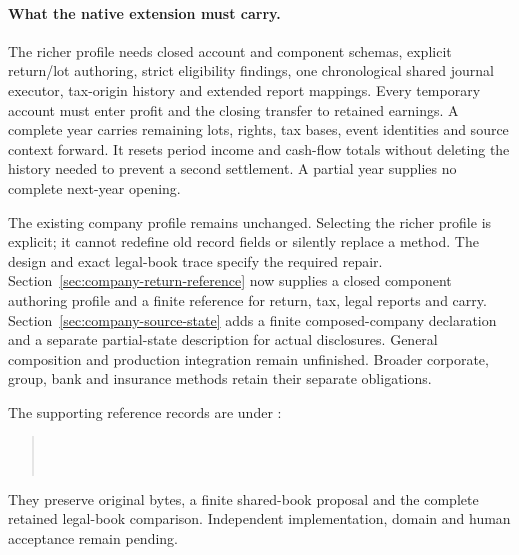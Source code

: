 \paragraph{What the native extension must carry.}
The richer profile needs closed account and component schemas, explicit
return/lot authoring, strict eligibility findings, one chronological shared
journal executor, tax-origin history and extended report mappings. Every
temporary account must enter profit and the closing transfer to retained
earnings. A complete year carries remaining lots, rights, tax bases, event
identities and source context forward. It resets period income and cash-flow
totals without deleting the history needed to prevent a second settlement.
A partial year supplies no complete next-year opening.

The existing company profile remains unchanged. Selecting the richer profile
is explicit; it cannot redefine old record fields or silently replace a
method. The design and exact legal-book trace specify the required repair.
Section~\ref{sec:company-return-reference} now supplies a closed component
authoring profile and a finite reference for return, tax, legal reports and
carry. Section~\ref{sec:company-source-state} adds a finite composed-company
declaration and a separate partial-state description for actual disclosures.
General composition and production integration remain unfinished. Broader
corporate, group, bank and insurance methods retain their separate obligations.

The supporting reference records are under :
\begin{quote}\small
{}\\
\\
\end{quote}
They preserve original bytes, a finite shared-book proposal and the complete
retained legal-book comparison. Independent implementation, domain and human
acceptance remain pending.



